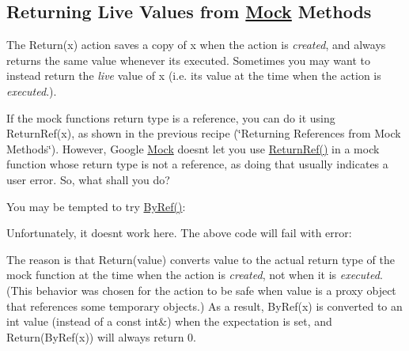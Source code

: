 \subsection*{Returning Live Values from \mbox{\hyperlink{class_mock}{Mock}} Methods}

The {\ttfamily Return(x)} action saves a copy of {\ttfamily x} when the action is {\itshape created}, and always returns the same value whenever it\textquotesingle{}s executed. Sometimes you may want to instead return the {\itshape live} value of {\ttfamily x} (i.\+e. its value at the time when the action is {\itshape executed}.).

If the mock function\textquotesingle{}s return type is a reference, you can do it using {\ttfamily Return\+Ref(x)}, as shown in the previous recipe (\char`\"{}\+Returning References
from Mock Methods\char`\"{}). However, Google \mbox{\hyperlink{class_mock}{Mock}} doesn\textquotesingle{}t let you use {\ttfamily \mbox{\hyperlink{namespacetesting_ac17089d5ca6377944d3792fbdc5c5d9b}{Return\+Ref()}}} in a mock function whose return type is not a reference, as doing that usually indicates a user error. So, what shall you do?

You may be tempted to try {\ttfamily \mbox{\hyperlink{namespacetesting_a1f94a81e042d7c40c8359c1471fbb61e}{By\+Ref()}}}\+:


\begin{DoxyCode}{0}
\DoxyCodeLine{}
\DoxyCodeLine{\};}
\end{DoxyCode}


Unfortunately, it doesn\textquotesingle{}t work here. The above code will fail with error\+:


\begin{DoxyCode}{0}
\end{DoxyCode}


The reason is that {\ttfamily Return(value)} converts {\ttfamily value} to the actual return type of the mock function at the time when the action is {\itshape created}, not when it is {\itshape executed}. (This behavior was chosen for the action to be safe when {\ttfamily value} is a proxy object that references some temporary objects.) As a result, {\ttfamily By\+Ref(x)} is converted to an {\ttfamily int} value (instead of a {\ttfamily const int\&}) when the expectation is set, and {\ttfamily Return(\+By\+Ref(x))} will always return 0.


